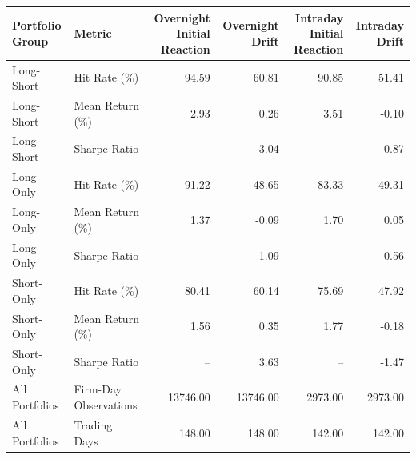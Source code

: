 \begin{tabular}{llrrrr}
\toprule
Portfolio Group &                Metric & Overnight Initial Reaction &  Overnight Drift & Intraday Initial Reaction &  Intraday Drift \\
\midrule
     Long-Short &          Hit Rate (\%) &                      94.59 &            60.81 &                     90.85 &           51.41 \\
     Long-Short &       Mean Return (\%) &                       2.93 &             0.26 &                      3.51 &           -0.10 \\
     Long-Short &          Sharpe Ratio &                         -- &             3.04 &                        -- &           -0.87 \\
      Long-Only &          Hit Rate (\%) &                      91.22 &            48.65 &                     83.33 &           49.31 \\
      Long-Only &       Mean Return (\%) &                       1.37 &            -0.09 &                      1.70 &            0.05 \\
      Long-Only &          Sharpe Ratio &                         -- &            -1.09 &                        -- &            0.56 \\
     Short-Only &          Hit Rate (\%) &                      80.41 &            60.14 &                     75.69 &           47.92 \\
     Short-Only &       Mean Return (\%) &                       1.56 &             0.35 &                      1.77 &           -0.18 \\
     Short-Only &          Sharpe Ratio &                         -- &             3.63 &                        -- &           -1.47 \\
 All Portfolios & Firm-Day Observations &                   13746.00 &         13746.00 &                   2973.00 &         2973.00 \\
 All Portfolios &          Trading Days &                     148.00 &           148.00 &                    142.00 &          142.00 \\
\bottomrule
\end{tabular}
